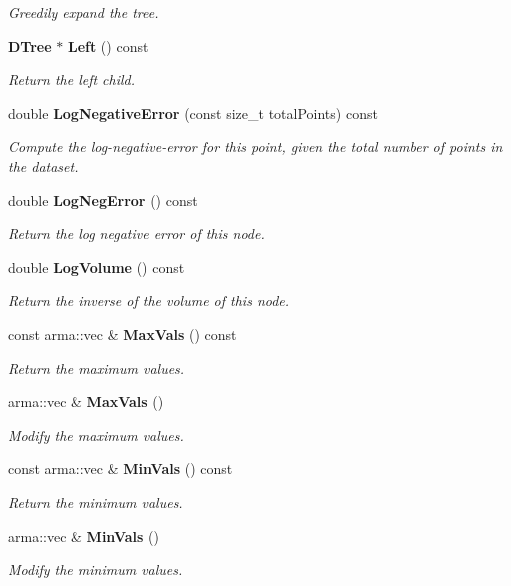 \begin{DoxyCompactItemize}
\begin{DoxyCompactList}\small\item\em Greedily expand the tree. \end{DoxyCompactList}\item 
{\bf D\-Tree} $\ast$ {\bf Left} () const 
\begin{DoxyCompactList}\small\item\em Return the left child. \end{DoxyCompactList}\item 
double {\bf Log\-Negative\-Error} (const size\-\_\-t total\-Points) const 
\begin{DoxyCompactList}\small\item\em Compute the log-\/negative-\/error for this point, given the total number of points in the dataset. \end{DoxyCompactList}\item 
double {\bf Log\-Neg\-Error} () const 
\begin{DoxyCompactList}\small\item\em Return the log negative error of this node. \end{DoxyCompactList}\item 
double {\bf Log\-Volume} () const 
\begin{DoxyCompactList}\small\item\em Return the inverse of the volume of this node. \end{DoxyCompactList}\item 
const arma\-::vec \& {\bf Max\-Vals} () const 
\begin{DoxyCompactList}\small\item\em Return the maximum values. \end{DoxyCompactList}\item 
arma\-::vec \& {\bf Max\-Vals} ()
\begin{DoxyCompactList}\small\item\em Modify the maximum values. \end{DoxyCompactList}\item 
const arma\-::vec \& {\bf Min\-Vals} () const 
\begin{DoxyCompactList}\small\item\em Return the minimum values. \end{DoxyCompactList}\item 
arma\-::vec \& {\bf Min\-Vals} ()
\begin{DoxyCompactList}\small\item\em Modify the minimum values. \end{DoxyCompactList}\item 

\end{DoxyCompactItemize}
